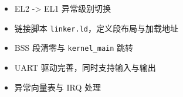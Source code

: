 
\begin{itemize}
    \item[\textbf{[ WIP ]}] EL2 -> EL1 异常级别切换
    \item[\textbf{[ WIP ]}] 链接脚本 \texttt{linker.ld}，定义段布局与加载地址
    \item[\textbf{[ WIP ]}] BSS 段清零与 \texttt{kernel\_main} 跳转
    \item[\textbf{[ WIP ]}] UART 驱动完善，同时支持输入与输出
    \item[\textbf{[ WIP ]}] 异常向量表与 IRQ 处理
\end{itemize}
